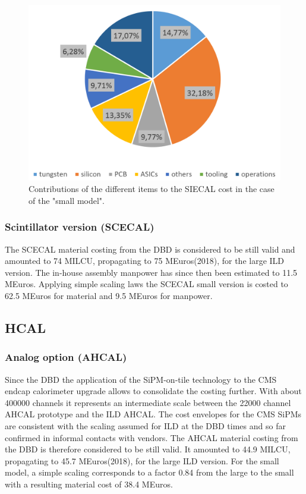 \begin{figure}[h!]
\centering
\includegraphics[width=0.8\hsize]{Costing/ECalsm_Si_cost_sharing.PNG}
\caption{Contributions of the different items to the SIECAL cost in the case of the "small model".} %
\label{fig:det:ECalsm_Si_cost_sharing}
\end{figure}

\subsubsection{Scintillator version (SCECAL)}
The SCECAL material costing from the DBD is considered to be still valid and amounted to 74 MILCU, propagating to 75 MEuros(2018), for the large ILD version. The in-house assembly manpower has since then been estimated to 11.5 MEuros. Applying simple scaling laws the SCECAL small version is costed to 62.5 MEuros for material and 9.5 MEuros for manpower.

\subsection{HCAL}
\subsubsection{Analog option (AHCAL)}
Since the DBD the application of the SiPM-on-tile technology to the CMS endcap calorimeter upgrade allows to consolidate the costing further. With about 400000 channels it represents an intermediate scale between the 22000 channel AHCAL prototype and the ILD AHCAL. 
The cost envelopes for the CMS SiPMs are consistent with the scaling assumed for ILD at the DBD times and so far confirmed in informal contacts with vendors. The AHCAL material costing from the DBD is therefore considered to be still valid. It amounted to 44.9 MILCU, propagating to 45.7 MEuros(2018), for the large ILD version. 
For the small model, a simple scaling corresponds to a factor 0.84 from the large to the small with a resulting material cost of 38.4 MEuros.

